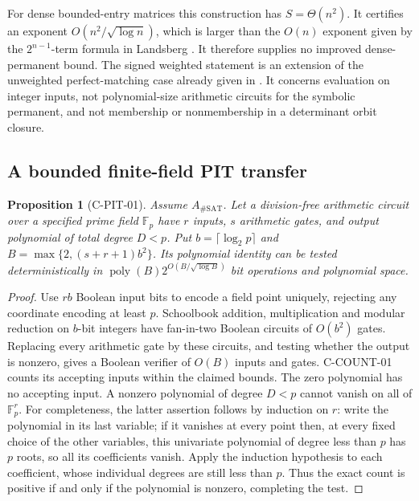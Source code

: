 \documentclass[11pt,a4paper]{article}
\newtheorem{proposition}{Proposition}[section]
\begin{document}
For dense bounded-entry matrices this construction has \(S=\Theta(n^2)\).
It certifies an exponent \(O(n^2/\sqrt{\log n})\), which is larger
than the \(O(n)\) exponent given by the \(2^{n-1}\)-term formula in
Landsberg \cite[\S8.2, equation~(22)]{CLandsberg13}.
It therefore supplies no improved dense-permanent bound.
The signed weighted statement is an extension of the unweighted
perfect-matching case already given in \cite[Corollary~1.3]{COAI26}.
It concerns evaluation on integer inputs, not polynomial-size
arithmetic circuits for the symbolic permanent, and not membership
or nonmembership in a determinant orbit closure.

\subsection{A bounded finite-field PIT transfer}

\begin{proposition}[C-PIT-01]
Assume \(A_{\#\mathrm{SAT}}\).  Let a division-free arithmetic circuit
over a specified prime field \(\mathbb F_p\) have \(r\) inputs,
\(s\) arithmetic gates, and output polynomial of total degree \(D<p\).
Put \(b=\lceil\log_2 p\rceil\) and
\(B=\max\{2,(s+r+1)b^2\}\).  Its polynomial identity can be tested
deterministically in \(\operatorname{poly}(B)2^{O(B/\sqrt{\log B})}\)
bit operations and polynomial space.
\end{proposition}
\begin{proof}
Use \(rb\) Boolean input bits to encode a field point uniquely, rejecting
any coordinate encoding at least \(p\).  Schoolbook addition,
multiplication and modular reduction on \(b\)-bit integers have
fan-in-two Boolean circuits of \(O(b^2)\) gates.  Replacing every
arithmetic gate by these circuits, and testing whether the output is
nonzero, gives a Boolean verifier of \(O(B)\) inputs and gates.
C-COUNT-01 counts its accepting inputs within the claimed bounds.
The zero polynomial has no accepting input.  A nonzero polynomial
of degree \(D<p\) cannot vanish on all of \(\mathbb F_p^r\).
For completeness, the latter assertion follows by induction on \(r\):
write the polynomial in its last variable; if it vanishes at every
point then, at every fixed choice of the other variables, this
univariate polynomial of degree less than \(p\) has \(p\) roots,
so all its coefficients vanish.  Apply the induction hypothesis to
each coefficient, whose individual degrees are still less than \(p\).
Thus the exact count is positive if and only if the polynomial is
nonzero, completing the test.
\end{proof}
\end{document}
